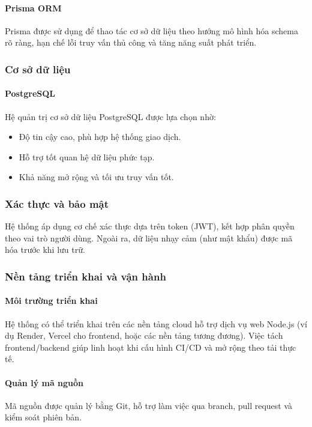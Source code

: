 \documentclass[13pt]{article}
\begin{document}
\paragraph{Prisma ORM}
Prisma được sử dụng để thao tác cơ sở dữ liệu theo hướng mô hình hóa schema rõ ràng,
hạn chế lỗi truy vấn thủ công và tăng năng suất phát triển.

\subsubsection{Cơ sở dữ liệu}
\paragraph{PostgreSQL}
Hệ quản trị cơ sở dữ liệu PostgreSQL được lựa chọn nhờ:
\begin{itemize}
    \item Độ tin cậy cao, phù hợp hệ thống giao dịch.
    \item Hỗ trợ tốt quan hệ dữ liệu phức tạp.
    \item Khả năng mở rộng và tối ưu truy vấn tốt.
\end{itemize}

\subsubsection{Xác thực và bảo mật}
Hệ thống áp dụng cơ chế xác thực dựa trên token (JWT), kết hợp phân quyền theo vai trò người dùng.
Ngoài ra, dữ liệu nhạy cảm (như mật khẩu) được mã hóa trước khi lưu trữ.

\subsubsection{Nền tảng triển khai và vận hành}
\paragraph{Môi trường triển khai}
Hệ thống có thể triển khai trên các nền tảng cloud hỗ trợ dịch vụ web Node.js
(ví dụ Render, Vercel cho frontend, hoặc các nền tảng tương đương).
Việc tách frontend/backend giúp linh hoạt khi cấu hình CI/CD và mở rộng theo tải thực tế.

\paragraph{Quản lý mã nguồn}
Mã nguồn được quản lý bằng Git, hỗ trợ làm việc qua branch, pull request và kiểm soát phiên bản.
\end{document}
